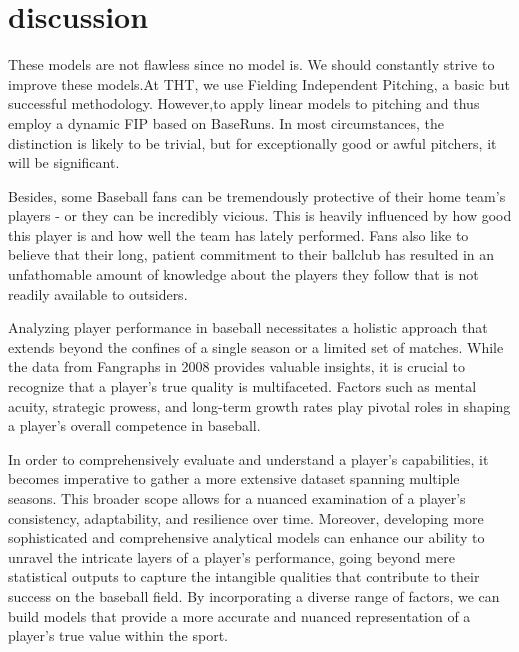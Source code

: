 \documentclass[12pt]{article}
\begin{document}
\section{discussion}
\label{sec:disc}

These models are not flawless since no model is. We should constantly 
strive to improve these models.At THT, we use Fielding Independent Pitching, a basic but successful 
methodology. However,to apply linear models to pitching and thus 
employ a dynamic FIP based on BaseRuns. In most circumstances, the distinction is likely to be trivial, 
but for exceptionally good or awful pitchers, it will be significant.

Besides, some Baseball fans can be tremendously protective of their home team's players 
- or they can be incredibly vicious. This is heavily influenced by how good this player 
is and how well the team has lately performed. Fans also like to believe that their long, 
patient commitment to their ballclub has resulted in an unfathomable amount of knowledge about 
the players they follow that is not readily available to outsiders.

Analyzing player performance in baseball necessitates a holistic approach that extends beyond 
the confines of a single season or a limited set of matches. While the data from Fangraphs in 2008 provides 
valuable insights, it is crucial to recognize that a player's true quality is multifaceted. Factors such as mental
acuity, strategic prowess, and long-term growth rates play pivotal roles in shaping a player's overall 
competence in baseball.

In order to comprehensively evaluate and understand a player's capabilities, it becomes imperative 
to gather a more extensive dataset spanning multiple seasons. This broader scope allows for a nuanced 
examination of a player's consistency, adaptability, and resilience over time. Moreover, developing more 
sophisticated and comprehensive analytical models can enhance our ability to unravel the intricate layers of 
a player's performance, going beyond mere statistical outputs to capture the intangible qualities that contribute
to their success on the baseball field. By incorporating a diverse range of factors, we can build models 
that provide a more accurate and nuanced representation of a player's true value within the sport.




\end{document}
